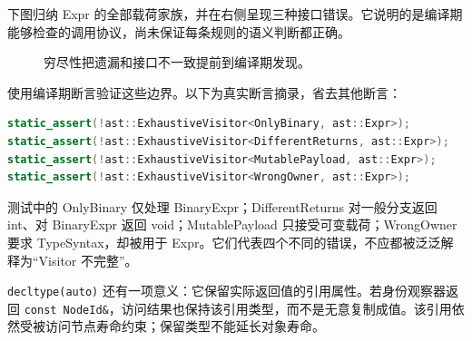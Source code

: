 下图归纳 Expr 的全部载荷家族，并在右侧呈现三种接口错误。它说明的是编译期能够检查的调用协议，尚未保证每条规则的语义判断都正确。
\begin{figure}[htbp]
\centering
{}
\caption{穷尽性把遗漏和接口不一致提前到编译期发现。}
\end{figure}
 使用编译期断言验证这些边界。以下为真实断言摘录，省去其他断言：
\begin{lstlisting}[language=C++]
static_assert(!ast::ExhaustiveVisitor<OnlyBinary, ast::Expr>);
static_assert(!ast::ExhaustiveVisitor<DifferentReturns, ast::Expr>);
static_assert(!ast::ExhaustiveVisitor<MutablePayload, ast::Expr>);
static_assert(!ast::ExhaustiveVisitor<WrongOwner, ast::Expr>);
\end{lstlisting}
测试中的 OnlyBinary 仅处理 BinaryExpr；DifferentReturns 对一般分支返回 int、对 BinaryExpr 返回 void；MutablePayload 只接受可变载荷；WrongOwner 要求 TypeSyntax，却被用于 Expr。它们代表四个不同的错误，不应都被泛泛解释为“Visitor 不完整”。

\texttt{decltype(auto)} 还有一项意义：它保留实际返回值的引用属性。若身份观察器返回 \texttt{const NodeId\&}，访问结果也保持该引用类型，而不是无意复制成值。该引用依然受被访问节点寿命约束；保留类型不能延长对象寿命。


